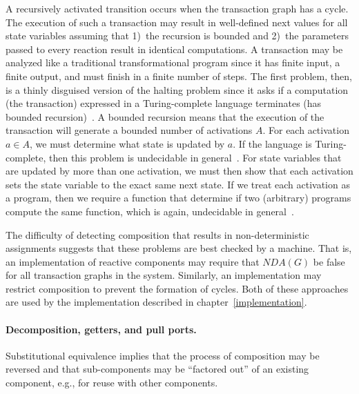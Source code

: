 A recursively activated transition occurs when the transaction graph has a cycle.
The execution of such a transaction may result in well-defined next values for all state variables assuming that 1)~the recursion is bounded and 2)~the parameters passed to every reaction result in identical computations.
A transaction may be analyzed like a traditional transformational program since it has finite input, a finite output, and must finish in a finite number of steps.
The first problem, then, is a thinly disguised version of the halting problem since it asks if a computation (the transaction) expressed in a Turing-complete language terminates (has bounded recursion)~\cite{Turing01011937, davis1958computability}.
A bounded recursion means that the execution of the transaction will generate a bounded number of activations $A$.
For each activation $a \in A$, we must determine what state is updated by $a$.
If the language is Turing-complete, then this problem is undecidable in general~\cite{Landi:1992:USA:161494.161501, Ramalingam:1994:UA:186025.186041}.
For state variables that are updated by more than one activation, we must then show that each activation sets the state variable to the exact same next state.
If we treat each activation as a program, then we require a function that determine if two (arbitrary) programs compute the same function, which is again, undecidable in general~\cite{Rice:53}.

The difficulty of detecting composition that results in non-deterministic assignments suggests that these problems are best checked by a machine.
That is, an implementation of reactive components may require that $NDA(G)$ be false for all transaction graphs in the system.
Similarly, an implementation may restrict composition to prevent the formation of cycles.
Both of these approaches are used by the implementation described in chapter~\ref{implementation}.

\paragraph{Decomposition, getters, and pull ports.}
Substitutional equivalence implies that the process of composition may be reversed and that sub-components may be ``factored out'' of an existing component, e.g., for reuse with other components.

